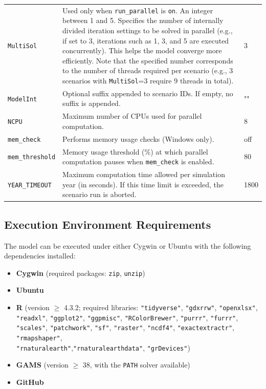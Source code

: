 \begin{table}[H]
\begin{xltabular}{\textwidth}{@{} l X l @{}}
\texttt{MultiSol} & 
Used only when \texttt{run\_parallel} is \texttt{on}.  
An integer between 1 and 5.  
Specifies the number of internally divided iteration settings to be solved in parallel 
(e.g., if set to 3, iterations such as 1, 3, and 5 are executed concurrently).  
This helps the model converge more efficiently.  
Note that the specified number corresponds to the number of threads required per scenario  
(e.g., 3 scenarios with \texttt{MultiSol}=3 require 9 threads in total). & 3 \\[2pt]
\texttt{ModelInt} & Optional suffix appended to scenario IDs. If empty, no suffix is appended. & "" \\[2pt]
\texttt{NCPU} & Maximum number of CPUs used for parallel computation. & 8 \\[2pt]
\texttt{mem\_check} & Performs memory usage checks (Windows only). & off \\[2pt]
\texttt{mem\_threshold} & 
Memory usage threshold (\%) at which parallel computation pauses 
when \texttt{mem\_check} is enabled. & 80 \\[2pt]
\texttt{YEAR\_TIMEOUT} & 
Maximum computation time allowed per simulation year (in seconds).  
If this time limit is exceeded, the scenario run is aborted. & 1800 \\ 
\bottomrule
\end{xltabular}
\end{table}

\clearpage

\subsection{Execution Environment Requirements}

The model can be executed under either Cygwin or Ubuntu with the following dependencies installed:

\begin{itemize}[leftmargin=2.5em]
  \item \textbf{Cygwin} (required packages: \texttt{zip}, \texttt{unzip})
  \item \textbf{Ubuntu}
  \item \textbf{R} (version $\geq$ 4.3.2; required libraries: 
    \texttt{"tidyverse"}, \texttt{"gdxrrw"}, \texttt{"openxlsx"}, \texttt{"readxl"},
    \texttt{"ggplot2"}, \texttt{"ggpmisc"}, \texttt{"RColorBrewer"},
    \texttt{"purrr"}, \texttt{"furrr"}, \texttt{"scales"},
    \texttt{"patchwork"}, \texttt{"sf"}, \texttt{"raster"}, \texttt{"ncdf4"},
    \texttt{"exactextractr"}, \texttt{"rmapshaper"}, \\
    \texttt{"rnaturalearth"},\texttt{"rnaturalearthdata"}, \texttt{"grDevices"})
  \item \textbf{GAMS} (version $\geq$ 38, with the \texttt{PATH} solver available)
  \item \textbf{GitHub}
\end{itemize}
